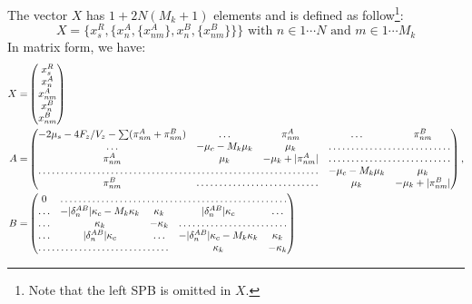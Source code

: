 \documentclass[a4paper,12pt]{article}
\begin{document}
The vector $X$ has $1 + 2N(M_k + 1)$ elements and is defined as
follow\footnote{Note that the left SPB is omitted in $X$.}:
\begin{equation*}
  X = \{x_s^R, \{x_n^A, \{x_{nm}^A\},  x_n^B,%
  \{x_{nm}^B \}\}\}\mbox{ with } n \in 1 \cdots N %
  \mbox{ and } m \in 1 \cdots M_k
\end{equation*}
In matrix form, we have:\\
\begin{equation}
  \begin{aligned}
    X = &%
    \begin{pmatrix}
      x_s^R\\
      x_n^A\\
      x_{nm}^A\\
      x_n^B\\
      x_{nm}^B\\
    \end{pmatrix}\\
    A = &%
    \begin{pmatrix}
      - 2 \mu_s - 4 F_z/V_z - \sum (\pi_{nm}^A + \pi_{nm}^B)& \hdots & \pi_{nm}^A &%
      \hdots &  \pi_{nm}^B\\
      \hdots &  -\mu_c - M_k \mu_k& \mu_k & \hdotsfor{2}\\
      \pi_{nm}^A & \mu_k & - \mu_k + |\pi_{nm}^A| & \hdotsfor{2}\\
      \hdotsfor{3} & -\mu_c - M_k \mu_k & \mu_k\\
      \pi_{nm}^B & \hdotsfor{2} & \mu_k & - \mu_k + |\pi_{nm}^B| \\
    \end{pmatrix}, \\
    B = &%
    \begin{pmatrix}
      \,0\, & \hdotsfor{4}\\
      \hdots & - |\delta_n^{AB}|\kappa_c - M_k \kappa_k & \kappa_k &%
      |\delta_n^{AB}|\kappa_c & \hdots \\
      \hdots & \kappa_k & -\kappa_k &  \hdotsfor{2}\\
      \hdots & |\delta_n^{AB}|\kappa_c & \hdots &%
      -|\delta_n^{AB}|\kappa_c - M_k \kappa_k & \kappa_k \\
      \hdotsfor{3}  & \kappa_k & - \kappa_k\\
    \end{pmatrix}\\

\end{aligned}
\end{equation}
\end{document}

